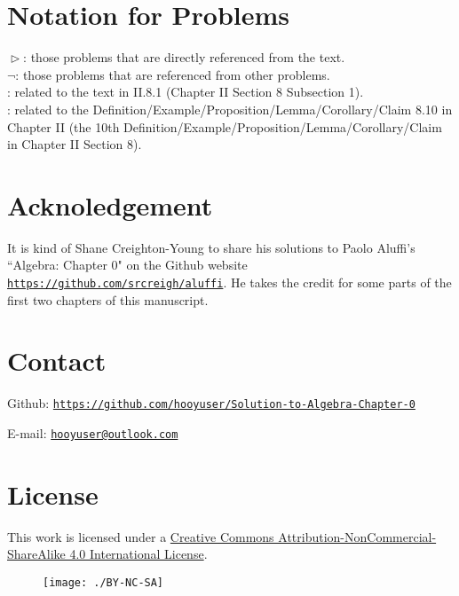 \documentclass[12pt,letterpaper,boxed]{hmcpset}
\renewcommand\appendix{\setcounter{secnumdepth}{-2}}
\begin{document}
\thispagestyle{empty}
\vspace{-5em}	
\rightline{\today}
\vspace*{1.5em}	

\tableofcontents
\thispagestyle{empty}
\appendix

\newpage
\thispagestyle{empty}
\section*{Notation for Problems}
$\vartriangleright$: those problems that are directly referenced from the text.\\

\noindent $\neg$: those problems that are referenced from other
problems.\\

\noindent [\textsection II.8.1]: related to the text in  II.8.1 (Chapter II Section 8 Subsection 1).\\

\noindent [II.8.10]: related to the Definition/Example/Proposition/Lemma/Corollary/Claim 8.10 in Chapter II (the 10th Definition/Example/Proposition/Lemma/Corollary/Claim in Chapter II Section 8).

\section*{Acknoledgement}
It is kind of Shane Creighton-Young to share his solutions to Paolo Aluffi's ``Algebra: Chapter 0"\cite{aluffi2009algebra} on the Github website \href{https://github.com/srcreigh/aluffi}{\texttt{https://github.com/srcreigh/aluffi}}. He takes the credit for some parts of the first two chapters of this manuscript. 

\section*{Contact}
Github:
\href{https://github.com/hooyuser/Solution-to-Algebra-Chapter-0}{\texttt{https://github.com/hooyuser/Solution-to-Algebra-Chapter-0}} 

\noindent E-mail: \href{mailto:hooyuser@outlook.com}{\texttt{hooyuser@outlook.com}}


\section*{License}
This work is licensed under a \href{http://creativecommons.org/licenses/by-nc-sa/4.0/}{Creative Commons Attribution-NonCommercial-ShareAlike 4.0 International License}.
\vfill
\begin{figure}[h]
	\centering\texttt{[image: ./BY-NC-SA]}
\end{figure}
\end{document}

